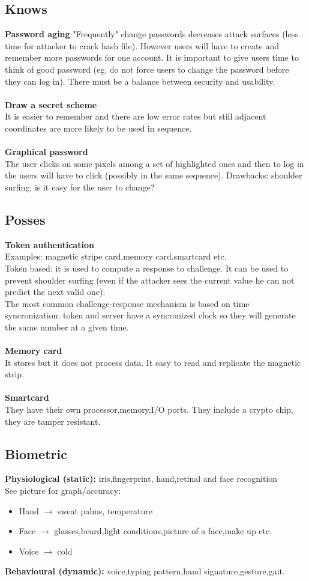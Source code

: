 \documentclass[10pt,a4paper]{book}
\begin{document}
\subsection{Knows}
\textbf{Password aging}
"Frequently" change passwords decreases attack surfaces (less time for attacker to crack hash file). However users will have to create and remember more passwords for one account. It is important to give users time to think of good password (eg. do not force users to change the password before they can log in). There must be a balance between security and usability.\\\\
\textbf{Draw a secret scheme}\\
It is easier to remember and there are low error rates but still adjacent coordinates are more likely to be used in sequence.\\\\
\textbf{Graphical password}\\
The user clicks on some pixels among a set of highlighted ones and then to log in the users will have to click (possibly in the same sequence). Drawbacks: shoulder surfing; is it easy for the user to change?
\subsection{Posses}
\textbf{Token authentication}\\
Examples: magnetic stripe card,memory card,smartcard etc.\\
Token based: it is used to compute a response to challenge. It can be used to prevent shoulder surfing (even if the attacker sees the current value he can not predict the next valid one).\\
The most common challenge-response mechanism is based on time syncronization: token and server have a syncronized clock so they will generate the same number at a given time.\\\\
\textbf{Memory card}\\
It stores but it does not process data. It easy to read and replicate the magnetic strip.\\\\
\textbf{Smartcard}\\
They have their own processor,memory,I/O ports. They include a crypto chip, they are tamper resistant.
\subsection{Biometric}
\textbf{Physiological (static):} iris,fingerprint, hand,retinal and face recognition\\
See picture for graph/accuracy: 
\begin{itemize}
\item Hand $\to$ sweat palms, temperature
\item Face $\to$ glasses,beard,light conditions,picture of a face,make up etc.
\item Voice $\to$ cold
\end{itemize}
\textbf{Behavioural (dynamic):} voice,typing pattern,hand signature,gesture,gait.
\end{document}
